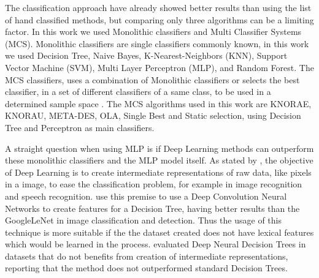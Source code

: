 The classification approach have already showed better results than using the list of hand classified methods, but comparing only three algorithms can be a limiting factor. In this work we used Monolithic classifiers and Multi Classifier Systems (MCS). Monolithic classifiers are single classifiers commonly known, in this work we used Decision Tree, Naive Bayes, K-Nearest-Neighbors (KNN), Support Vector Machine (SVM), Multi Layer Perceptron (MLP), and Random Forest. The MCS classifiers, uses a combination of Monolithic classifiers or selects the best classifier, in a set of different classifiers of a same class, to be used in a determined sample space \citep{cruz2018dynamic}. The MCS algorithms used in this work are KNORAE, KNORAU, META-DES, OLA, Single Best and Static selection, using Decision Tree and Perceptron as main classifiers.

A straight question when using MLP is if Deep Learning methods can outperform these monolithic classifiers and the MLP model itself. As stated by \cite{lecun2015deep}, the objective of Deep Learning is to create intermediate representations of raw data, like pixels in a image, to ease the classification problem, for example in image recognition and speech recognition. \cite{kontschieder2015deep} use this premise to use a Deep Convolution Neural Networks to create features for a Decision Tree, having better results than the GoogleLeNet \citep{szegedy2015going} in image classification and detection. Thus the usage of this technique is more suitable if the the dataset created does not have lexical features which would be learned in the process. \cite{yang2018deep} evaluated Deep Neural Decision Trees in datasets that do not benefits from creation of intermediate representations, reporting that the method does not outperformed standard Decision Trees.
